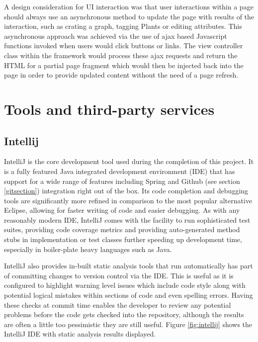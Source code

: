 A design consideration for UI interaction was that user interactions within a page should always use an asynchronous method to update the page with results of the interaction, such as crating a graph, tagging Plants or editing attributes. This asynchronous approach was achieved via the use of ajax based Javascript functions invoked when users would click buttons or links. The view controller class within the framework would process these ajax requests and return the HTML for a partial page fragment which would then be injected back into the page in order to provide updated content without the need of a page refresh.

\section{Tools and third-party services}
\subsection{Intellij}

IntelliJ \cite{_intellij} is the core development tool used during the completion of this project. It is a fully featured Java integrated development environment (IDE) that has support for a wide range of features including Spring and Github (see section \ref{gitsection}) integration right out of the box. Its code completion and debugging tools are significantly more refined in comparison to the most popular alternative Eclipse, allowing for faster writing of code and easier debugging. As with any reasonably modern IDE, IntelliJ comes with the facility to run sophisticated test suites, providing code coverage metrics and providing auto-generated method stubs in implementation or test classes further speeding up development time, especially in boiler-plate heavy languages such as Java.

IntelliJ also provides in-built static analysis tools that run automatically has part of committing changes to version control via the IDE. This is useful as it is configured to highlight warning level issues which include code style along with potential logical mistakes within sections of code and even spelling errors. Having these checks at commit time enables the developer to review any potential problems before the code gets checked into the repository, although the results are often a little too pessimistic they are still useful. Figure \ref{fig:intellij} shows the IntelliJ IDE with static analysis results displayed.

